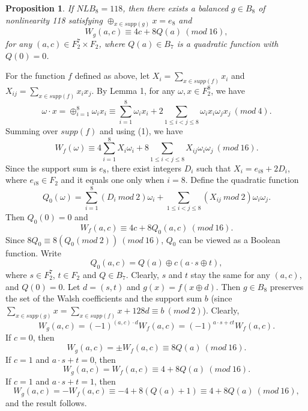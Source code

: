 \documentclass[11pt]{article}
\newtheorem{proposition}{Proposition}
\newtheorem{open problem}{Open problem}
\begin{document}
\begin{proposition} If $NLB_8=118$, then there exists a balanced $g\in B_8$ of nonlinearity 118 satisfying $\oplus_{x\in supp(g)} x=e_8$ and
\begin{equation}
W_g(a,c)\equiv 4c+8Q(a)\ (mod\ 16),
\end{equation}
for any $(a,c)\in F_2^7\times F_2$, where $Q(a)\in B_7$ is a quadratic function with $Q(0)=0$.
\end{proposition}
\proof For the function $f$ defined as above, let $X_i=\sum_{x\in supp(f)}x_i$ and $X_{ij}=\sum_{x\in supp(f)}x_ix_j$. By Lemma 1, for any $\omega, x\in F_2^8$, we have
\[
\omega\cdot x=\oplus_{i=1}^{8} \omega_ix_i\equiv \sum_{i=1}^8 \omega_ix_i+2\sum_{1\le i<j\le 8} \omega_ix_i\omega_jx_j\ (mod \ 4).
\]
Summing over $supp(f)$ and using (1), we have
\[
 W_f(\omega)\equiv 4\sum_{i=1}^8 X_i\omega_i+8\sum_{1\le i<j\le 8} X_{ij}\omega_i\omega_j\ (mod \ 16).
\]
Since the support sum is $e_8$, there exist integers $D_i$ such that $X_i=e_{i8}+2D_i$, where $e_{i8}\in F_2$ and it equals one only when $i=8$. Define the quadratic function
\[
Q_0(\omega)=\sum_{i=1}^8(D_i \ mod\ 2)\omega_i+\sum_{1\le i<j\le 8} (X_{ij}\ mod\ 2)\omega_i\omega_j.
\]
Then $Q_0(0)=0$ and
\[
W_f(a,c)\equiv 4c+8Q_0(a,c)\ (mod \ 16).
\]
Since $8Q_0\equiv 8(Q_0 (mod \ 2))\ (mod \ 16)$, $Q_0$ can be viewed as a Boolean function. Write
\[
Q_0(a,c)=Q(a)\oplus c(a\cdot s\oplus t),
 \]
 where $s\in F_2^7$, $t\in F_2$ and $Q\in B_7$. Clearly, $s$ and $t$ stay the same for any $(a,c)$, and $Q(0)=0$. Let $d=(s,t)$ and $g(x)=f(x\oplus d)$. Then $g\in B_8$ preserves the set of the Walsh coefficients and the support sum $b$ (since $\sum_{x\in supp(g)}x=\sum_{x\in supp(f)}x+128d\equiv b\ (mod \ 2)$). Clearly,
\[
W_g(a,c)=(-1)^{(a,c)\cdot d}W_f(a,c)=(-1)^{a\cdot s+ct}W_f(a,c).
\]
If $c=0$, then
\[
W_g(a,c)=\pm W_f(a,c)\equiv 8Q(a)\ (mod\ 16).
\]
If $c=1$ and $a\cdot s+t=0$, then
\[
W_g(a,c)=W_f(a,c)\equiv 4+8Q(a)\ (mod\ 16).
\]
If $c=1$ and $a\cdot s+t=1$, then
\[
W_g(a,c)=-W_f(a,c)\equiv -4+8(Q(a)+1)\equiv 4+8Q(a)\ (mod\ 16),
\]
and the result follows.
\endproof
\end{document}
